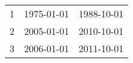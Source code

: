 % 
\begin{tabular}{ccc}
  \hline
  \hline
1 & 1975-01-01 & 1988-10-01 \\ 
  2 & 2005-01-01 & 2010-10-01 \\ 
  3 & 2006-01-01 & 2011-10-01 \\ 
   \hline
\end{tabular}
